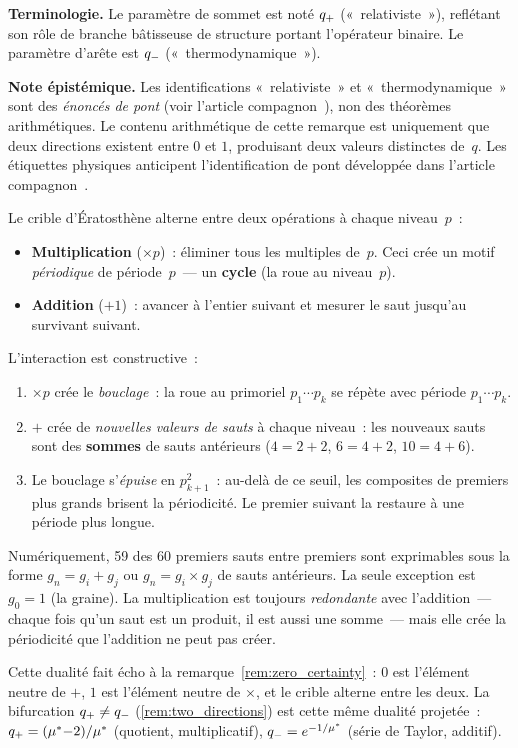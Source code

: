 \documentclass[12pt,a4paper]{article}
\begin{document}
\begin{remarque}
\medskip\noindent
\textbf{Terminologie.}
Le paramètre de sommet est noté $q_{+}$ («~relativiste~»), reflétant
son rôle de branche bâtisseuse de structure portant l'opérateur
binaire. Le paramètre d'arête est $q_{-}$ («~thermodynamique~»).

\medskip\noindent
\textbf{Note épistémique.}
Les identifications «~relativiste~» et «~thermodynamique~» sont des
\emph{énoncés de pont} (voir l'article compagnon~\cite{companion_M5}),
non des théorèmes arithmétiques. Le contenu arithmétique de cette
remarque est uniquement que deux directions existent entre $0$ et $1$,
produisant deux valeurs distinctes de~$q$. Les étiquettes physiques
anticipent l'identification de pont développée dans l'article
compagnon~\cite{companion_M5}.
\end{remarque}

\begin{remarque}
\label{rem:add_mult_duality}
Le crible d'Ératosthène alterne entre deux opérations à chaque
niveau~$p$~:
\begin{itemize}[nosep]
\item \textbf{Multiplication} ($\times p$)~: éliminer tous les
  multiples de~$p$. Ceci crée un motif \emph{périodique} de
  période~$p$~--- un \textbf{cycle} (la roue au niveau~$p$).
\item \textbf{Addition} ($+1$)~: avancer à l'entier suivant et
  mesurer le saut jusqu'au survivant suivant.
\end{itemize}

L'interaction est constructive~:
\begin{enumerate}[nosep]
\item $\times p$ crée le \emph{bouclage}~: la roue au primoriel
  $p_1 \cdots p_k$ se répète avec période $p_1 \cdots p_k$.
\item $+$ crée de \emph{nouvelles valeurs de sauts} à chaque niveau~:
  les nouveaux sauts sont des \textbf{sommes} de sauts antérieurs
  ($4 = 2{+}2$, $6 = 4{+}2$, $10 = 4{+}6$).
\item Le bouclage s'\emph{épuise} en $p_{k+1}^2$~: au-delà de ce
  seuil, les composites de premiers plus grands brisent la
  périodicité. Le premier suivant la restaure à une période plus
  longue.
\end{enumerate}

Numériquement, 59 des 60 premiers sauts entre premiers sont
exprimables sous la forme $g_n = g_i + g_j$ ou $g_n = g_i \times g_j$
de sauts antérieurs. La seule exception est $g_0 = 1$ (la graine).
La multiplication est toujours \emph{redondante} avec l'addition~---
chaque fois qu'un saut est un produit, il est aussi une somme~---
mais elle crée la périodicité que l'addition ne peut pas créer.

Cette dualité fait écho à la remarque~\ref{rem:zero_certainty}~:
$0$ est l'élément neutre de $+$, $1$ est l'élément neutre de
$\times$, et le crible alterne entre les deux. La bifurcation
$q_{+} \neq q_{-}$ (\cref{rem:two_directions}) est cette même
dualité projetée~: $q_{+} = ({\mu^{*}}{-}2)/{\mu^{*}}$ (quotient,
multiplicatif), $q_{-} = e^{-1/{\mu^{*}}}$ (série de Taylor, additif).
\end{remarque}
\end{document}
